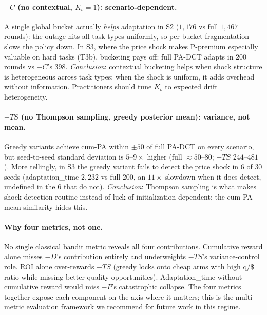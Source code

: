 \paragraph{$-C$ (no contextual, $K_b = 1$): scenario-dependent.}
A single global bucket actually \emph{helps} adaptation in S2 ($1{,}176$ vs full $1{,}467$ rounds): the outage hits all task types uniformly, so per-bucket fragmentation slows the policy down. In S3, where the price shock makes P-premium especially valuable on hard tasks (T3b), bucketing pays off: full PA-DCT adapts in $200$ rounds vs $-C$'s $398$. \emph{Conclusion}: contextual bucketing helps when shock structure is heterogeneous across task types; when the shock is uniform, it adds overhead without information. Practitioners should tune $K_b$ to expected drift heterogeneity.

\paragraph{$-TS$ (no Thompson sampling, greedy posterior mean): variance, not mean.}
Greedy variants achieve cum-PA within $\pm 50$ of full PA-DCT on every scenario, but seed-to-seed standard deviation is $5$--$9\times$ higher (full $\approx 50$--$80$; $-TS$ $244$--$481$). More tellingly, in S3 the greedy variant fails to detect the price shock in $6$ of $30$ seeds (adaptation\_time $2{,}232$ vs full $200$, an $11\times$ slowdown when it does detect, undefined in the $6$ that do not). \emph{Conclusion}: Thompson sampling is what makes shock detection routine instead of luck-of-initialization-dependent; the cum-PA-mean similarity hides this.

\paragraph{Why four metrics, not one.}
No single classical bandit metric reveals all four contributions. Cumulative reward alone misses $-D$'s contribution entirely and underweights $-TS$'s variance-control role. ROI alone over-rewards $-TS$ (greedy locks onto cheap arms with high q/\$ ratio while missing better-quality opportunities). Adaptation\_time without cumulative reward would miss $-P$'s catastrophic collapse. The four metrics together expose each component on the axis where it matters; this is the multi-metric evaluation framework we recommend for future work in this regime.
